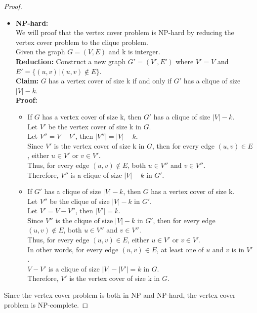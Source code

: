 \documentclass{article}
\begin{document}
\begin{proof}
\begin{itemize}
        \item \textbf{NP-hard:} \\
        We will proof that the vertex cover problem is NP-hard by reducing the vertex cover problem to the clique problem.\\
        Given the graph $G = (V,E)$ and k is interger.\\
        \textbf{Reduction:} Construct a new graph $G' = (V',E')$ where $V' = V$ and $E' = \{(u,v) | (u,v) \notin E\}$.\\
        \textbf{Claim:} $G$ has a vertex cover of size k if and only if $G'$ has a clique of size $|V| - k$.\\
        \textbf{Proof:} \\
        \begin{itemize}
            \item If $G$ has a vertex cover of size k, then $G'$ has a clique of size $|V| - k$.\\
            Let $V'$ be the vertex cover of size k in $G$.\\
            Let $V'' = V - V'$, then $|V''| = |V| - k$.\\
            Since $V'$ is the vertex cover of size k in $G$, then for every edge $(u,v) \in E$, either $u \in V'$ or $v \in V'$.\\
            Thus, for every edge $(u,v) \notin E$, both $u \in V''$ and $v \in V''$.\\
            Therefore, $V''$ is a clique of size $|V| - k$ in $G'$.
            \item If $G'$ has a clique of size $|V| - k$, then $G$ has a vertex cover of size k.\\
            Let $V''$ be the clique of size $|V| - k$ in $G'$.\\
            Let $V' = V - V''$, then $|V'| = k$.\\
            Since $V''$ is the clique of size $|V| - k$ in $G'$, then for every edge $(u,v) \notin E$, both $u \in V''$ and $v \in V''$.\\
            Thus, for every edge $(u,v) \in E$, either $u \in V'$ or $v \in V'$.\\
            In other words, for every edge $(u,v) \in E$, at least one of $u$ and $v$ is in $V'$.\\
            $V-V'$ is a clique of size $|V| - |V'| = k$ in $G$.\\
            Therefore, $V'$ is the vertex cover of size k in $G$.
        \end{itemize}
    \end{itemize}
    
    Since the vertex cover problem is both in NP and NP-hard, the vertex cover problem is NP-complete.

\end{proof}
\end{document}
